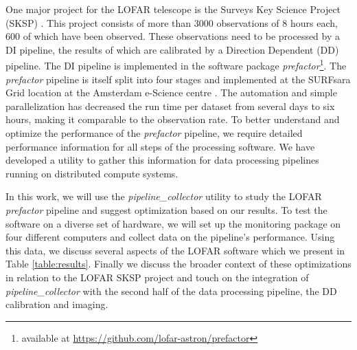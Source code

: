 One major project for the LOFAR telescope is the Surveys Key Science Project (SKSP) \citep{lotss}. This project consists of more than 3000 observations of 8 hours each, 600 of which have been observed. These observations need to be processed by a DI pipeline, the results of which are calibrated by a Direction Dependent (DD) pipeline. The DI pipeline is implemented in the software package \textit{prefactor}\footnote{available at \protect\url{https://github.com/lofar-astron/prefactor}}. The \textit{prefactor} pipeline is itself split into four stages and implemented at the SURFsara Grid location at the Amsterdam e-Science centre \citep{SurfSara,mechev}. The automation and simple parallelization has decreased the run time per dataset from several days to six hours, making it comparable to the observation rate. To better understand and optimize the performance of the \textit{prefactor} pipeline, we require detailed performance information for all steps of the processing software. We have developed a utility to gather this information for data processing pipelines running on distributed compute systems. 

In this work, we will use the \textit{pipeline\_collector} utility to study the LOFAR \textit{prefactor} pipeline and suggest optimization based on our results. To test the software on a diverse set of hardware, we will set up the monitoring package on four different computers and collect data on the pipeline's performance. Using this data, we discuss several aspects of the LOFAR software which we present in Table \ref{table:results}. Finally we discuss the broader context of these optimizations in relation to the LOFAR SKSP project and touch on the integration of \textit{pipeline\_collector} with the second half of the data processing pipeline, the DD calibration and imaging. 
    
